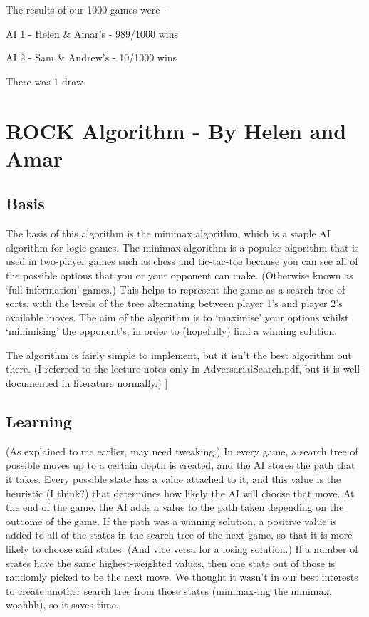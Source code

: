 \documentclass[11pt]{article}
\begin{document}
The results of our 1000 games were -

AI 1 - Helen \& Amar's - 989/1000 wins

AI 2 - Sam \& Andrew's - 10/1000 wins

There was 1 draw.
\section{ROCK Algorithm - By Helen and Amar}
\label{sec-2}

\subsection{Basis}
\label{sec-2-1}

The basis of this algorithm is the minimax algorithm, which is a staple AI algorithm for logic games. The minimax algorithm is a popular algorithm that is used in two-player games such as chess and tic-tac-toe because you can see all of the possible options that you or your opponent can make. (Otherwise known as ‘full-information’ games.)  This helps to represent the game as a search tree of sorts, with the levels of the tree alternating between player 1’s and player 2’s available moves. The aim of the algorithm is to ‘maximise’ your options whilst ‘minimising’ the opponent’s, in order to (hopefully) find a winning solution.

The algorithm is fairly simple to implement, but it isn’t the best algorithm out there. (I referred to the lecture notes only in AdversarialSearch.pdf, but it is well-documented in literature normally.) ]
\subsection{Learning}
\label{sec-2-2}

(As explained to me earlier, may need tweaking.) In every game, a search tree of possible moves up to a certain depth is created, and the AI stores the path that it takes. Every possible state has a value attached to it, and this value is the heuristic (I think?) that determines how likely the AI will choose that move. At the end of the game, the AI adds a value to the path taken depending on the outcome of the game. If the path was a winning solution, a positive value is added to all of the states in the search tree of the next game, so that it is more likely to choose said states. (And vice versa for a losing solution.) If a number of states have the same highest-weighted values, then one state out of those is randomly picked to be the next move. We thought it wasn’t in our best interests to create another search tree from those states (minimax-ing the minimax, woahhh), so it saves time.
\end{document}
